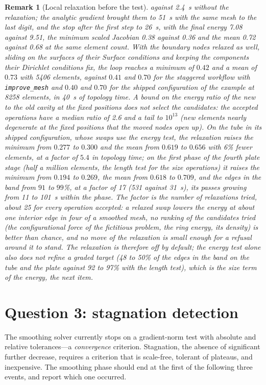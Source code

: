 \documentclass[11pt]{article}
\newcommand{\code}[1]{\texttt{#1}}
\newtheorem{remark}{Remark}
\begin{document}
\begin{remark}[Local relaxation before the test]
against 2.4~s without the relaxation; the analytic gradient brought them
to 51~s with the same mesh to the last digit, and the stop after the
first step to 26~s, with the final energy 7.08 against 9.51, the
minimum scaled Jacobian 0.38 against 0.36 and the mean 0.72 against
0.68 at the same element count. With the boundary nodes relaxed as well,
sliding on the surfaces of their Surface conditions and keeping the
components their Dirichlet conditions fix, the loop reaches a minimum of
$0.42$ and a mean of $0.73$ with 5406 elements, against $0.41$ and
$0.70$ for the staggered workflow with \code{improve\_mesh} and $0.40$
and $0.70$ for the shipped configuration of the example at 8258
elements, in 40~s of topology time. A bound on the energy ratio of the new
to the old cavity at the fixed positions does not select the candidates:
the accepted operations have a median ratio of 2.6 and a tail to
$10^{13}$ (new elements nearly degenerate at the fixed positions that
the moved nodes open up). On the tube in its shipped
configuration, whose swaps use the energy test, the relaxation raises the
minimum from $0.277$ to $0.300$ and the mean from $0.619$ to $0.656$ with
6\% fewer elements, at a factor of $5.4$ in topology time; on the first
phase of the fourth plate stage (half a million elements, the length test
for the size operations) it raises the minimum from $0.194$ to $0.269$,
the mean from $0.618$ to $0.709$, and the edges in the band from $91$ to
$99$\%, at a factor of 17 (531 against 31~s), its passes growing from 11
to 101~s within the phase. The factor is the number of relaxations
tried, about 25 for every operation accepted: a relaxed swap lowers the
energy at about one interior edge in four of a smoothed mesh, no ranking
of the candidates tried (the configurational force of the fictitious
problem, the ring energy, its density) is better than chance, and no move
of the relaxation is small enough for a refusal around it to stand. The
relaxation is therefore off by default; the energy test alone also does
not refine a graded target (48 to 50\% of the edges in the band on the
tube and the plate against 92 to 97\% with the length test), which is the
size term of the energy, the next item.
\end{remark}

\section{Question 3: stagnation detection}
\label{sec:stagnation}

The smoothing solver currently stops on a gradient-norm test with
absolute and relative tolerances---a \emph{convergence} criterion.
Stagnation, the absence of significant further decrease, requires a
criterion that is scale-free, tolerant of plateaus, and inexpensive.
The smoothing phase should end at the first of the following three
events, and report which one occurred.
\end{document}
